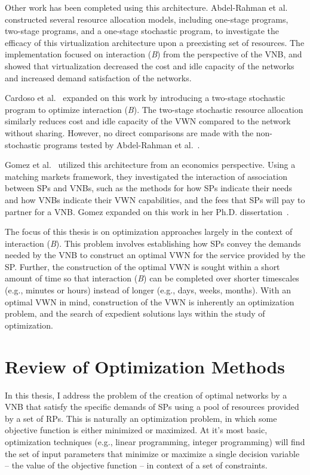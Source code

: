 \documentclass[12pt,dvipsnames]{report}
\begin{document}
Other work has been completed using this architecture.  Abdel-Rahman et al.~\cite{MJ_CCNC_16} constructed several resource allocation models, including one-stage programs, two-stage programs, and a one-stage stochastic program, to investigate the efficacy of this virtualization architecture upon a preexisting set of resources.  The implementation focused on interaction (\emph{B}) from the perspective of the VNB, and showed that virtualization decreased the cost and idle capacity of the networks and increased demand satisfaction of the networks.

Cardoso et al.~\cite{MJ_MECOMM_17} expanded on this work by introducing a two-stage stochastic program to optimize interaction (\emph{B}).  The two-stage stochastic resource allocation similarly reduces cost and idle capacity of the VWN compared to the network without sharing.  However, no direct comparisons are made with the non-stochastic programs tested by Abdel-Rahman et al.~\cite{MJ_CCNC_16}.

Gomez et al.~\cite{pittir33631} utilized this architecture from an economics perspective.  Using a matching markets framework, they investigated the interaction of association between SPs and VNBs, such as the methods for how SPs indicate their needs and how VNBs indicate their VWN capabilities, and the fees that SPs will pay to partner for a VNB.  Gomez expanded on this work in her Ph.D. dissertation~\cite{pittir33130}.%

The focus of this thesis is on optimization approaches largely in the context of interaction (\emph{B}).  This problem involves establishing how SPs convey the demands needed by the VNB to construct an optimal VWN for the service provided by the SP.  Further, the construction of the optimal VWN is sought within a short amount of time so that interaction (\emph{B}) can be completed over shorter timescales (e.g., minutes or hours) instead of longer (e.g., days, weeks, months).  With an optimal VWN in mind, construction of the VWN is inherently an optimization problem, and the search of expedient solutions lays within the study of optimization.

\section{Review of Optimization Methods} \label{sec:optreview}

In this thesis, I address the problem of the creation of optimal networks by a VNB that satisfy the specific demands of SPs using a pool of resources provided by a set of RPs.  This is naturally an optimization problem, in which some objective function is either minimized or maximized.  At it's most basic, optimization techniques (e.g., linear programming, integer programming) will find the set of input parameters that minimize or maximize a single decision variable -- the value of the objective function -- in context of a set of constraints.
\end{document}
